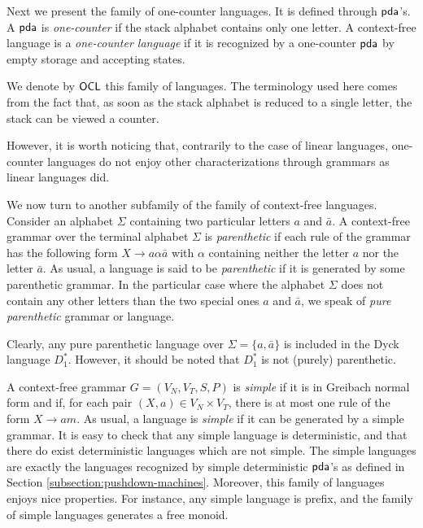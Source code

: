 Next we present the family of one-counter languages. It is defined through $\textup{\sf pda}$'s. A $\textup{\sf pda}$ is \emph{one-counter} if the stack alphabet contains only one letter. A context-free language is a \emph{one-counter language} if it is recognized by a one-counter $\textup{\sf pda}$ by empty storage and accepting states.

We denote by \index{$\Ocl$}$\Ocl$ this family of languages. The terminology used here comes from the fact that, as soon as the stack alphabet is reduced to a single letter, the stack can be viewed a counter.

However, it is worth noticing that, contrarily to the case of linear languages, one-counter languages do not enjoy other characterizations through grammars as linear languages did.

We now turn to another subfamily of the family of context-free languages. Consider an alphabet $\Sigma$ containing two particular letters $a$ and $\bar{a}$. A context-free grammar over the terminal alphabet $\Sigma$ is \emph{parenthetic} if each rule of the grammar has the following form $X \to a \alpha \bar{a}$ with $\alpha$ containing neither the letter $a$ nor the letter $\bar{a}$. As usual, a language is said to be \emph{parenthetic} if it is generated by some parenthetic grammar. In the particular case where the alphabet $\Sigma$ does not contain any other letters than the two special ones $a$ and $\bar{a}$, we speak of \emph{pure parenthetic} grammar or language.

Clearly, any pure parenthetic language over $\Sigma = \{a, \bar{a}\}$ is included in the Dyck language $D_1^*$. However, it should be noted that $D_1^*$ is not (purely) parenthetic.

A context-free grammar $G = (V_N, V_T, S, P)$ is  \emph{simple} if it is in  Greibach normal form and if, for each pair $(X, a) \in V_N \times V_T$, there is at most one rule of the form $X \to am$. As usual, a language is \emph{simple} if it can be generated by a simple grammar. It is easy to check that any simple language is deterministic, and that there do exist deterministic languages which are not simple. The simple languages are exactly the languages recognized by  simple deterministic $\textup{\sf pda}$'s as defined in Section \ref{subsection:pushdown-machines}. Moreover, this family of languages enjoys nice properties. For instance, any simple language is prefix, and the family of simple languages generates a free monoid.

